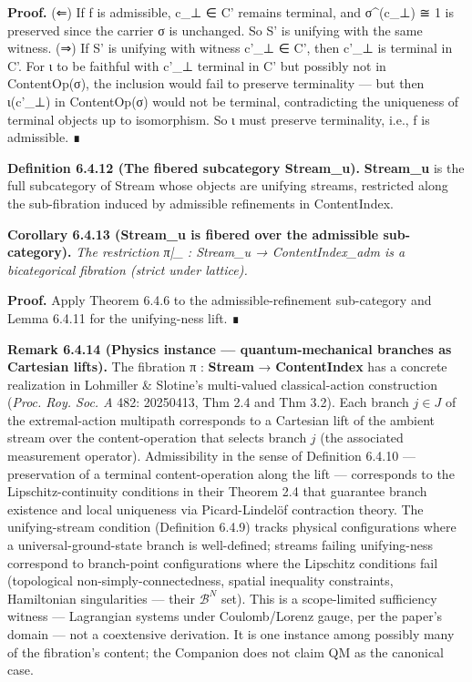 \documentclass[11pt, openany]{book}
\begin{document}
\textbf{Proof.} (⇐) If f is admissible, c\_\allowbreak{}⊥ ∈ C' remains terminal, and σ\textasciicircum{}(c\_\allowbreak{}⊥) ≅ 1 is preserved since the carrier σ is unchanged. So S' is unifying with the same witness. (⇒) If S' is unifying with witness c'\_\allowbreak{}⊥ ∈ C', then c'\_\allowbreak{}⊥ is terminal in C'. For ι to be faithful with c'\_\allowbreak{}⊥ terminal in C' but possibly not in ContentOp(σ), the inclusion would fail to preserve terminality --- but then ι(c'\_\allowbreak{}⊥) in ContentOp(σ) would not be terminal, contradicting the uniqueness of terminal objects up to isomorphism. So ι must preserve terminality, i.e., f is admissible. ∎

\textbf{Definition 6.4.12 (The fibered subcategory Stream\_\allowbreak{}u).} \textbf{Stream\_\allowbreak{}u} is the full subcategory of Stream whose objects are unifying streams, restricted along the sub-fibration induced by admissible refinements in ContentIndex.

\textbf{Corollary 6.4.13 (Stream\_\allowbreak{}u is fibered over the admissible sub-category).} \textit{The restriction π|\_ : Stream\_\allowbreak{}u → ContentIndex\_\allowbreak{}adm is a bicategorical fibration (strict under lattice).}

\textbf{Proof.} Apply Theorem 6.4.6 to the admissible-refinement sub-category and Lemma 6.4.11 for the unifying-ness lift. ∎

\textbf{Remark 6.4.14 (Physics instance --- quantum-mechanical branches as Cartesian lifts).} The fibration π : \textbf{Stream} → \textbf{ContentIndex} has a concrete realization in Lohmiller \& Slotine's multi-valued classical-action construction (\textit{Proc. Roy. Soc. A} 482: 20250413, Thm 2.4 and Thm 3.2). Each branch $j \in J$ of the extremal-action multipath corresponds to a Cartesian lift of the ambient stream over the content-operation that selects branch $j$ (the associated measurement operator). Admissibility in the sense of Definition 6.4.10 --- preservation of a terminal content-operation along the lift --- corresponds to the Lipschitz-continuity conditions in their Theorem 2.4 that guarantee branch existence and local uniqueness via Picard-Lindelöf contraction theory. The unifying-stream condition (Definition 6.4.9) tracks physical configurations where a universal-ground-state branch is well-defined; streams failing unifying-ness correspond to branch-point configurations where the Lipschitz conditions fail (topological non-simply-connectedness, spatial inequality constraints, Hamiltonian singularities --- their $\mathcal{B}^N$ set). This is a scope-limited sufficiency witness --- Lagrangian systems under Coulomb/Lorenz gauge, per the paper's domain --- not a coextensive derivation. It is one instance among possibly many of the fibration's content; the Companion does not claim QM as the canonical case.
\end{document}
